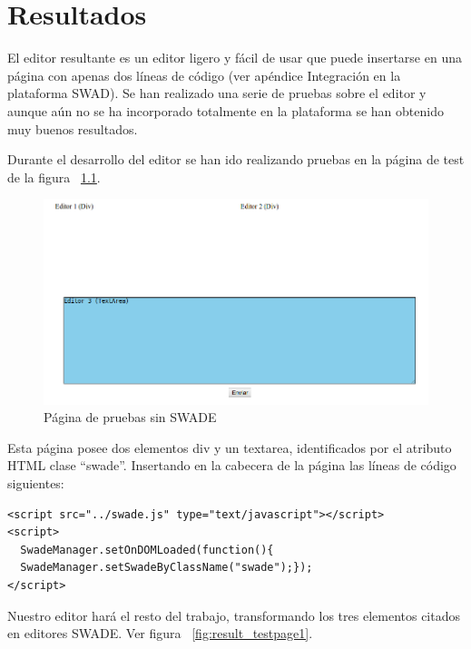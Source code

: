 \chapter{Resultados}

El editor resultante es un editor ligero y fácil de usar que puede insertarse en una página con apenas dos líneas de código (ver apéndice Integración en la plataforma SWAD). Se han realizado una serie de pruebas sobre el editor y aunque aún no se ha incorporado totalmente en la plataforma se han obtenido muy buenos resultados.

Durante el desarrollo del editor se han ido realizando pruebas en la página de test de la figura ~\ref{fig:result_testpage0}.

\begin{figure}[h!]
  \centering
      \includegraphics[width=7in]{fig/result_testpage0}
  \caption{Página de pruebas sin SWADE}
  \label{fig:result_testpage0}

\end{figure}


Esta página posee dos elementos div y un textarea, identificados por el atributo HTML clase ``swade''. Insertando en la cabecera de la página las líneas de código siguientes:
\begin{verbatim}
<script src="../swade.js" type="text/javascript"></script>
<script>
  SwadeManager.setOnDOMLoaded(function(){
  SwadeManager.setSwadeByClassName("swade");});
</script>
\end{verbatim}

Nuestro editor hará el resto del trabajo, transformando los tres elementos citados en editores SWADE. Ver figura ~\ref{fig:result_testpage1}.

